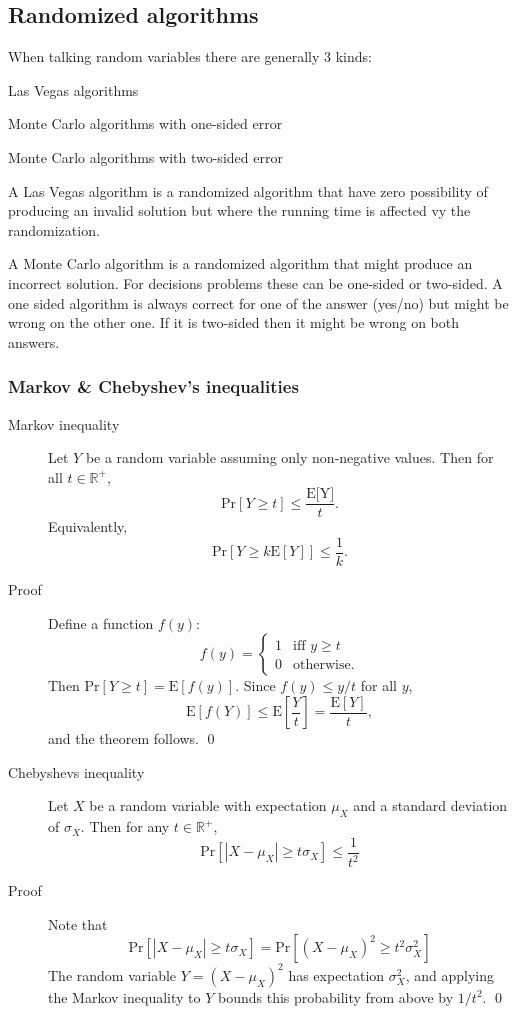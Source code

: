 \subsection{Randomized algorithms}

When talking random variables there are generally 3 kinds:
\begin{enumerate*}
  \item Las Vegas algorithms
  \item Monte Carlo algorithms with one-sided error
  \item Monte Carlo algorithms with two-sided error
\end{enumerate*}

A Las Vegas algorithm is a randomized algorithm that have zero possibility of
producing an invalid solution but where the running time is affected vy the
randomization.

A Monte Carlo algorithm is a randomized algorithm that might produce an
incorrect solution. For decisions problems these can be one-sided or
two-sided. A one sided algorithm is always correct for one of the answer
(yes/no) but might be wrong on the other one. If it is two-sided then it might
be wrong on both answers.


\subsubsection{Markov \& Chebyshev's inequalities}
\begin{description}
\item[Markov inequality] Let $Y$ be a random variable assuming only non-negative
  values. Then for all $t \in \mathbb{R}^+$,
  \[
    \text{Pr}[Y \geq t] \leq \frac{\text{E[Y]}}{t}.
  \]
  Equivalently,
  \[
    \text{Pr}[Y \geq k\text{E}[Y]] \leq \frac{1}{k}.
  \]
\item[Proof] Define a function $f(y)$:
  \[
   f(y) = \begin{cases}
     1 & \text{iff } y \geq t\\
     0 & \text{otherwise.}
   \end{cases}
  \]
  Then $\text{Pr}[Y \geq t] = \text{E}[f(y)]$. Since $f(y) \leq y/t$ for all $y$,
  \[
    \text{E}[f(Y)] \leq \text{E}\left [\frac{Y}{t} \right ] = \frac{\text{E}[Y]}{t},
  \]
  and the theorem follows. \qed
\end{description}

\begin{description}
\item[Chebyshevs inequality] Let $X$ be a random variable with expectation
  $\mu_X$ and a standard deviation of $\sigma_X$. Then for any $t \in
  \mathbb{R}^+$,
  \[
    \text{Pr}[|X - \mu_X| \geq t\sigma_X] \leq \frac{1}{t^2}
  \]
\item[Proof] Note that
  \[
    \text{Pr}[|X - \mu_X| \geq t\sigma_X] = \text{Pr}[(X - \mu_X)^2 \geq
    t^2\sigma_X^2]
  \]
  The random variable $Y = (X - \mu_X)^2$ has expectation $\sigma_X^2$, and
  applying the Markov inequality to $Y$ bounds this probability from above by
  $1/t^2$. \qed
\end{description}

